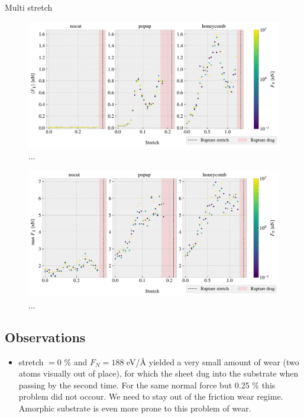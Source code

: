 Multi stretch 



\begin{figure}[H]
  \centering
  \includegraphics[width=\linewidth]{figures/baseline/multi_stretch_mean_compare.pdf}
  \caption{...}
  \label{fig:}
\end{figure}


\begin{figure}[H]
  \centering
  \includegraphics[width=\linewidth]{figures/baseline/multi_stretch_max_compare.pdf}
  \caption{...}
  \label{fig:}
\end{figure}



\newpage
\subsection*{Observations}



\begin{itemize}
  \item stretch $= 0$ \% and $F_N = 188$ eV/Å yielded a very small amount of wear (two atoms visually out of place), for which the sheet dug into the substrate when passing by the second time. For the same normal force but 0.25 \% this problem did not occour. We need to stay out of the friction wear regime. Amorphic substrate is even more prone to this problem of wear.
\end{itemize}